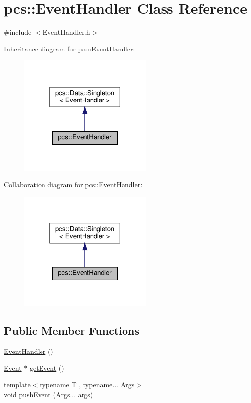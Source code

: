 \hypertarget{classpcs_1_1EventHandler}{}\section{pcs\+:\+:Event\+Handler Class Reference}
\label{classpcs_1_1EventHandler}


{\ttfamily \#include $<$Event\+Handler.\+h$>$}



Inheritance diagram for pcs\+:\+:Event\+Handler\+:\nopagebreak
\begin{figure}[H]
\begin{center}
\leavevmode
\includegraphics[width=186pt]{classpcs_1_1EventHandler__inherit__graph}
\end{center}
\end{figure}


Collaboration diagram for pcs\+:\+:Event\+Handler\+:\nopagebreak
\begin{figure}[H]
\begin{center}
\leavevmode
\includegraphics[width=186pt]{classpcs_1_1EventHandler__coll__graph}
\end{center}
\end{figure}
\subsection*{Public Member Functions}
\begin{DoxyCompactItemize}
\item 
\hyperlink{classpcs_1_1EventHandler_af980c02cecb98a61be2d23dcdbb525c4}{Event\+Handler} ()
\item 
\hyperlink{classpcs_1_1Event}{Event} $\ast$ \hyperlink{classpcs_1_1EventHandler_ac55d94bdc1d32947725e63ca0d5e93cb}{get\+Event} ()
\item 
{\footnotesize template$<$typename T , typename... Args$>$ }\\void \hyperlink{classpcs_1_1EventHandler_aa149c95e48d820d7c61f70c98b158e6b}{push\+Event} (Args... args)
\end{DoxyCompactItemize}
